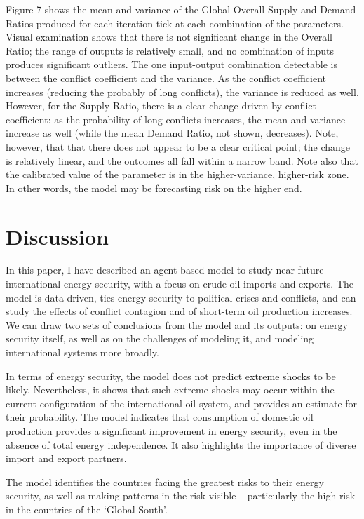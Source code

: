 \documentclass{article}
\begin{document}
Figure 7 shows the mean and variance of the Global Overall Supply and Demand Ratios produced for each iteration-tick at each combination of the parameters. Visual examination shows that there is not significant change in the Overall Ratio; the range of outputs is relatively small, and no combination of inputs produces significant outliers. The one input-output combination detectable is between the conflict coefficient and the variance. As the conflict coefficient increases (reducing the probably of long conflicts), the variance is reduced as well. However, for the Supply Ratio, there is a clear change driven by conflict coefficient: as the probability of long conflicts increases, the mean and variance increase as well (while the mean Demand Ratio, not shown, decreases). Note, however, that that there does not appear to be a clear critical point; the change is relatively linear, and the outcomes all fall within a narrow band. Note also that the calibrated value of the parameter is in the higher-variance, higher-risk zone. In other words, the model may be forecasting risk on the higher end. 



\section{Discussion}

In this paper, I have described an agent-based model to study near-future international energy security, with a focus on crude oil imports and exports. The model is data-driven, ties energy security to political crises and conflicts, and can study the effects of conflict contagion and of short-term oil production increases. We can draw two sets of conclusions from the model and its outputs: on energy security itself, as well as on the challenges of modeling it, and modeling international systems more broadly.

In terms of energy security, the model does not predict extreme shocks to be likely. Nevertheless, it shows that such extreme shocks may occur within the current configuration of the international oil system, and provides an estimate for their probability. The model indicates that consumption of domestic oil production provides a significant improvement in energy security, even in the absence of total energy independence. It also highlights the importance of diverse import and export partners. 

The model identifies the countries facing the greatest risks to their energy security, as well as making patterns in the risk visible -- particularly the high risk in the countries of the `Global South'. 
\end{document}
